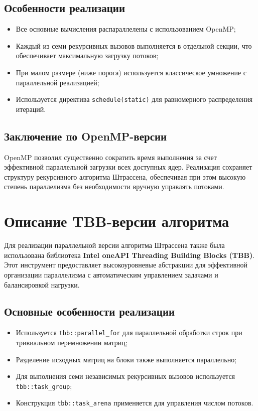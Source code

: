 \documentclass[14pt,a4paper]{extarticle}
\begin{document}
\subsection*{Особенности реализации}

\begin{itemize}
    \item Все основные вычисления распараллелены с использованием OpenMP;
    \item Каждый из семи рекурсивных вызовов выполняется в отдельной секции, что обеспечивает максимальную загрузку потоков;
    \item При малом размере (ниже порога) используется классическое умножение с параллельной реализацией;
    \item Используется директива \texttt{schedule(static)} для равномерного распределения итераций.
\end{itemize}

\subsection*{Заключение по OpenMP-версии}

OpenMP позволил существенно сократить время выполнения за счет эффективной параллельной загрузки всех доступных ядер. Реализация сохраняет структуру рекурсивного алгоритма Штрассена, обеспечивая при этом высокую степень параллелизма без необходимости вручную управлять потоками.

\newpage
\section{Описание TBB-версии алгоритма}

Для реализации параллельной версии алгоритма Штрассена также была использована библиотека \textbf{Intel oneAPI Threading Building Blocks (TBB)}. Этот инструмент предоставляет высокоуровневые абстракции для эффективной организации параллелизма с автоматическим управлением задачами и балансировкой нагрузки.

\subsection*{Основные особенности реализации}

\begin{itemize}
    \item Используется \texttt{tbb::parallel\_for} для параллельной обработки строк при тривиальном перемножении матриц;
    \item Разделение исходных матриц на блоки также выполняется параллельно;
    \item Для выполнения семи независимых рекурсивных вызовов используется \texttt{tbb::task\_group};
    \item Конструкция \texttt{tbb::task\_arena} применяется для управления числом потоков.
\end{itemize}
\end{document}
